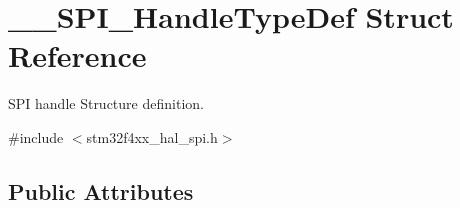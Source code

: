 \hypertarget{struct_____s_p_i___handle_type_def}{}\section{\+\_\+\+\_\+\+S\+P\+I\+\_\+\+Handle\+Type\+Def Struct Reference}
\label{struct_____s_p_i___handle_type_def}


S\+PI handle Structure definition.  




{\ttfamily \#include $<$stm32f4xx\+\_\+hal\+\_\+spi.\+h$>$}

\subsection*{Public Attributes}
